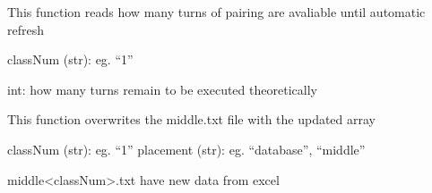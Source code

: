 \documentclass[letterpaper,10pt,english]{sphinxmanual}
\begin{document}

\begin{fulllineitems}
\label{\detokenize{countDown:countDown.readCountdownNumber}}
\pysigstartsignatures
{}
\pysigstopsignatures
\sphinxAtStartPar
This function reads how many turns of pairing are avaliable until automatic refresh
\begin{description}
\sphinxAtStartPar
classNum (str): eg. “1”

\sphinxAtStartPar
int: how many turns remain to be executed theoretically

\end{description}

\end{fulllineitems}


\sphinxstepscope
{}\label{\detokenize{ExcelFunctions:module-ExcelFunctions}}

\begin{fulllineitems}
\label{\detokenize{ExcelFunctions:ExcelFunctions.ExcelToMiddle}}
\pysigstartsignatures
{}
\pysigstopsignatures
\sphinxAtStartPar
This function overwrites the middle.txt file with the updated array
\begin{description}
\sphinxAtStartPar
classNum (str): eg. “1”
placement (str): eg. “database”, “middle”

\sphinxAtStartPar
middle\textless{}classNum\textgreater{}.txt have new data from excel

\end{description}

\end{fulllineitems}

\end{document}
